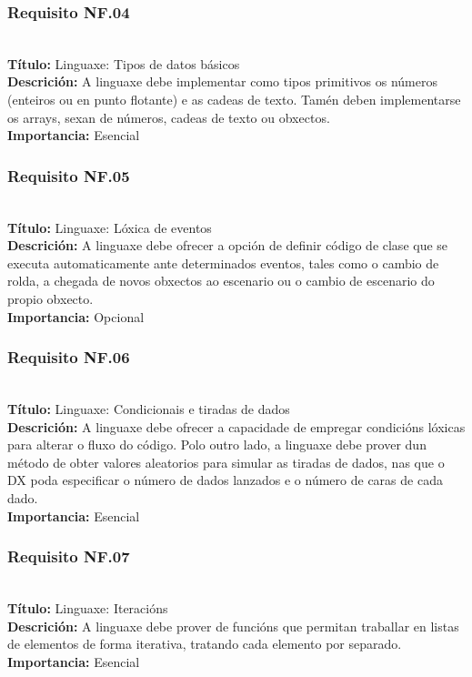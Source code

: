 \subsubsection{Requisito NF.04}~\\
{\bf Título:} Linguaxe: Tipos de datos básicos\\
{\bf Descrición:} A linguaxe debe implementar como tipos primitivos os números
(enteiros ou en punto flotante) e as cadeas de texto. Tamén deben implementarse
os arrays, sexan de números, cadeas de texto ou obxectos.\\
{\bf Importancia:} Esencial

\subsubsection{Requisito NF.05}~\\
{\bf Título:} Linguaxe: Lóxica de eventos\\
{\bf Descrición:} A linguaxe debe ofrecer a opción de definir código de clase
que se executa automaticamente ante determinados eventos, tales como o cambio
de rolda, a chegada de novos obxectos ao escenario ou o cambio de escenario do
propio obxecto.\\
{\bf Importancia:} Opcional

\subsubsection{Requisito NF.06}~\\
{\bf Título:} Linguaxe: Condicionais e tiradas de dados\\
{\bf Descrición:} A linguaxe debe ofrecer a capacidade de empregar condicións
lóxicas para alterar o fluxo do código. Polo outro lado, a linguaxe debe prover
dun método de obter valores aleatorios para simular as tiradas de dados, nas
que o DX poda especificar o número de dados lanzados e o número de caras de
cada dado.\\
{\bf Importancia:} Esencial

\subsubsection{Requisito NF.07}~\\
{\bf Título:} Linguaxe: Iteracións\\
{\bf Descrición:} A linguaxe debe prover de funcións que permitan traballar en
listas de elementos de forma iterativa, tratando cada elemento por separado.\\
{\bf Importancia:} Esencial

